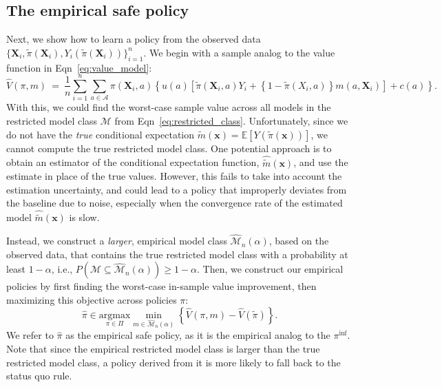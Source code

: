 \documentclass[12pt]{article}
\theoremstyle{definition}
\newcommand{\E}{\ensuremath{\mathbb{E}}}
\newcommand{\argmax}{\text{argmax}}
\newcommand{\bX}{\bm X}
\newcommand{\bx}{\bm x}
\newcommand{\<}{\langle}
\renewcommand{\>}{\rangle}
\newcommand\mcal[1]{\ensuremath{\mathcal{#1}}}
\begin{document}
\subsection{The empirical safe policy}
\label{sec:opt_data}

Next, we show
how to learn a policy from the observed data
$\{\bX_i, \tilde{\pi}(\bX_i), Y_i(\tilde{\pi}(\bX_i))\}_{i=1}^n$.  We begin
with a sample analog to the value function in
Eqn~\eqref{eq:value_model}:
\begin{equation}
  \label{eq:value_model_empirical}
  \hat{V}(\pi, m) \ = \ \frac{1}{n}\sum_{i=1}^n\sum_{a \in \mathcal{A}} \pi(\bX_i, a) \left\{
    u(a) \left[\tilde{\pi}(\bX_i, a) Y_i + \left\{1 - \tilde{\pi}(X_i, a)\right\}m(a, \bX_i) \right]+c(a)\right\}.
\end{equation}
With this, we could find the worst-case sample value across all models
in the restricted model class $\mcal{M}$ from
Eqn~\eqref{eq:restricted_class}.  Unfortunately, since we do not have
the \emph{true} conditional expectation
$\tilde{m}(\bx) = \E[Y(\tilde{\pi}(\bx))]$, we cannot compute the true
restricted model class.  One potential approach is to obtain an
estimator of the conditional expectation function,
$\hat{\tilde{m}}(\bx)$, and use the estimate in place of the true
values. However, this fails to take into account the estimation
uncertainty, and could lead to a policy that improperly deviates from
the baseline due to noise, especially when the convergence rate of the
estimated model $\hat{\tilde{m}}(\bx)$ is slow.

Instead, we construct a \emph{larger}, empirical model class
$\widehat{\mcal{M}}_n(\alpha)$, based on the observed data, that
contains the true restricted model class with a probability at least
$1 - \alpha$, i.e.,
$P\left(\mcal{M} \subseteq \widehat{\mcal{M}}_n(\alpha)\right) \geq 1
- \alpha.$
Then, we construct our empirical policies by first finding the
worst-case in-sample value improvement, then maximizing this objective
across policies $\pi$:
\begin{equation}
  \label{eq:maximin_emp}
  \hat{\pi}\in \underset{\pi \in \Pi}{\argmax} \min_{m \in \widehat{\mcal{M}}_n(\alpha)} \left\{\hat{V}(\pi, m) - \hat{V}(\tilde{\pi})\right\}.
\end{equation}
We refer to $\hat{\pi}$ as the empirical safe policy, as it is the empirical
analog to the $\pi^{\inf}$.
Note that since the empirical restricted
model class is larger than the true restricted model class, a policy
derived from it is more likely to fall back to the status quo rule.
\end{document}
